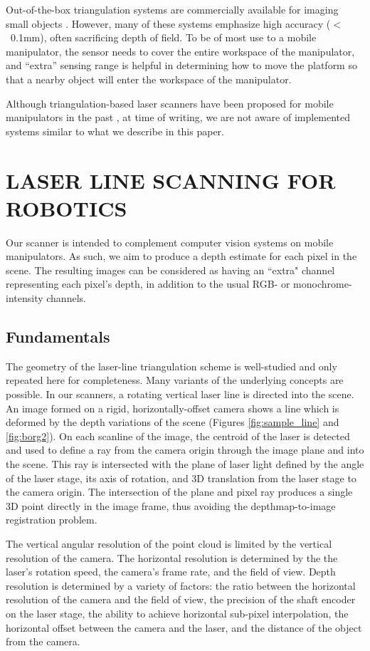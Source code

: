 \documentclass[letterpaper, 10 pt, conference]{ieeeconf}  %
\begin{document}
Out-of-the-box triangulation systems are commercially available for
imaging small objects \cite{bib:nextengine}. However, many of these systems
emphasize high accuracy ($<$~0.1mm), often sacrificing
depth of field. To be of most use to a mobile manipulator, the sensor needs to
cover the entire workspace of the manipulator, and ``extra'' sensing range is
helpful in determining how to move the platform so that a nearby object will
enter the workspace of the manipulator.

Although triangulation-based laser scanners have been proposed for mobile
manipulators in the past \cite{bib:door-iros-94}, at time of writing, we are
not aware of implemented systems similar to what we describe in this paper. 

\section{LASER LINE SCANNING FOR ROBOTICS}

Our scanner is intended to complement computer vision systems on mobile
manipulators. As such, we aim to produce a depth estimate for each pixel in the
scene. The resulting images can be considered as having an ``extra" channel
representing each pixel's depth, in addition to the usual RGB- or
monochrome-intensity channels.

\subsection{Fundamentals}

The geometry of the laser-line triangulation scheme is well-studied and only
repeated here for completeness. Many variants of the underlying concepts are
possible. In our scanners, a rotating vertical laser line is directed into the
scene.  An image formed on a rigid, horizontally-offset camera shows a line
which is deformed by the depth variations of the scene (Figures
\ref{fig:sample_line} and \ref{fig:borg2}).  On each scanline of the image, the
centroid of the laser is detected and used to define a ray from the camera
origin through the image plane and into the scene. This ray is intersected with
the plane of laser light defined by the angle of the laser stage, its axis of
rotation, and 3D translation from the laser stage to the camera origin.  The
intersection of the plane and pixel ray produces a single 3D point directly in
the image frame, thus avoiding the depthmap-to-image registration problem.

The vertical angular resolution of the point cloud is limited by the vertical
resolution of the camera. The horizontal resolution is determined by
the the laser's rotation speed, the camera's frame rate, and the field of view.
Depth resolution is determined by a variety of factors: the ratio between the
horizontal resolution of the camera and the field of view, the precision of the
shaft encoder on the laser stage, the ability to achieve horizontal sub-pixel
interpolation, the horizontal offset between the camera and the laser, and the
distance of the object from the camera.
\end{document}
